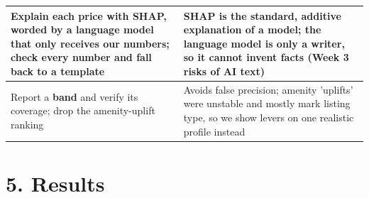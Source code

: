 \documentclass[10pt,a4paper]{article}
\begin{document}
\begin{center}
{\begin{tabular}{>{\raggedright\arraybackslash}p{6.38cm}>{\raggedright\arraybackslash}p{10.18cm}}
Explain each price with SHAP, worded by a language model that only receives our numbers; check every number and fall back to a template & SHAP is the standard, additive explanation of a model; the language model is only a writer, so it cannot invent facts (Week 3 risks of AI text)\\\hline
Report a \textbf{band} and verify its coverage; drop the amenity-uplift ranking & Avoids false precision; amenity 'uplifts' were unstable and mostly mark listing type, so we show levers on one realistic profile instead\\\hline
\end{tabular}}\end{center}
\section*{5. Results}
\end{document}
